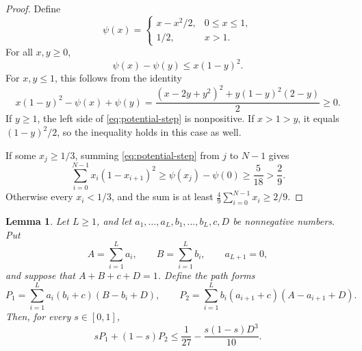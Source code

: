 \documentclass[11pt]{article}
\newtheorem{lemma}[theorem]{Lemma}
\numberwithin{equation}{section}
\begin{document}
\begin{proof}
Define
\[
 \psi(x)=
 \begin{cases}
 x-x^2/2,&0\le x\le1,\\
 1/2,&x>1.
 \end{cases}
\]
For all \(x,y\ge0\),
\begin{equation}\label{eq:potential-step}
 \psi(x)-\psi(y)\le x(1-y)^2.
\end{equation}
For \(x,y\le1\), this follows from the identity
\[
 x(1-y)^2-\psi(x)+\psi(y)
 =\frac{(x-2y+y^2)^2+y(1-y)^2(2-y)}2\ge0.
\]
If \(y\ge1\), the left side of \eqref{eq:potential-step} is
nonpositive. If \(x>1>y\), it equals \((1-y)^2/2\), so the
inequality holds in this case as well.

If some \(x_j\ge1/3\), summing \eqref{eq:potential-step} from
\(j\) to \(N-1\) gives
\[
 \sum_{i=0}^{N-1}x_i(1-x_{i+1})^2
 \ge\psi(x_j)-\psi(0)\ge\frac5{18}>\frac29.
\]
Otherwise every \(x_i<1/3\), and the sum is at least
\(\frac49\sum_{i=0}^{N-1}x_i\ge2/9\).
\end{proof}

\begin{lemma}\label{lem:cubic}
Let \(L\ge1\), and let \(a_1,\ldots,a_L,b_1,\ldots,b_L,c,D\)
be nonnegative numbers. Put
\[
 A=\sum_{i=1}^L a_i,\qquad B=\sum_{i=1}^L b_i,
 \qquad a_{L+1}=0,
\]
and suppose that \(A+B+c+D=1\). Define the path forms
\[
 P_1=\sum_{i=1}^L a_i(b_i+c)(B-b_i+D),\qquad
 P_2=\sum_{i=1}^L b_i(a_{i+1}+c)(A-a_{i+1}+D).
\]
Then, for every \(s\in[0,1]\),
\begin{equation}\label{eq:cubic-loss}
 sP_1+(1-s)P_2\le\frac1{27}-\frac{s(1-s)D^3}{10}.
\end{equation}
\end{lemma}
\end{document}
